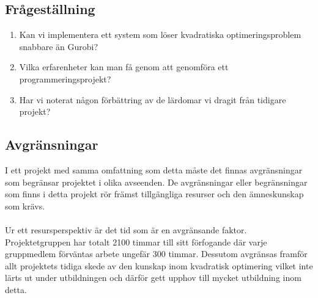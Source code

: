 \subsection{Frågeställning}
	\begin{enumerate}
		\item Kan vi implementera ett system som löser kvadratiska optimeringsproblem snabbare än Gurobi?
		\item Vilka erfarenheter kan man få genom att genomföra ett programmeringsprojekt?
		\item Har vi noterat någon förbättring av de lärdomar vi dragit från tidigare projekt?
	\end{enumerate}

\subsection{Avgränsningar}
I ett projekt med samma omfattning som detta måste det finnas avgränsningar som begränsar projektet i olika avseenden. De avgränsningar eller begränsningar som finns i detta projekt rör främst tillgängliga resurser och den ämneskunskap som krävs.
\\ \\
Ur ett resursperspektiv är det tid som är en avgränsande faktor. Projektetgruppen har totalt 2100 timmar till sitt förfogande där varje gruppmedlem förväntas arbete ungefär 300 timmar. Dessutom avgränsas framför allt projektets tidiga skede av den kunskap inom kvadratisk optimering vilket inte lärts ut under utbildningen och därför gett upphov till mycket utbildning inom detta.